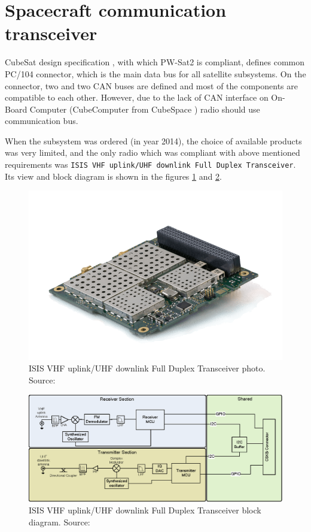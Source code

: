 \section{Spacecraft communication transceiver}
\label{section:comm_design}
CubeSat design specification \cite{cubesat_spec}, with which PW-Sat2 is compliant, defines common PC/104 connector, which is the main data bus for all satellite subsystems. On the connector, two \iic and two CAN buses are defined and most of the components are compatible to each other. However, due to the lack of CAN interface on On-Board Computer (CubeComputer from CubeSpace \cite{cubespace_website}) radio should use \iic communication bus.

When the subsystem was ordered (in year \si{2014}), the choice of available products was very limited, and the only radio which was compliant with above mentioned requirements was \texttt{ISIS VHF uplink/UHF downlink Full Duplex Transceiver}. Its view and block diagram is shown in the figures \ref{ISIS_TRXvU_photo} and \ref{ISIS_TRXvU_block_diagram}.

\begin{figure}[H]
    \centering
    \includegraphics[width=0.5\paperwidth]{img/4/ISIS-radio-UHF-VHF-min.png}
    \caption{ISIS VHF uplink/UHF downlink Full Duplex Transceiver photo. Source: \cite{isis_trxvu}}
    \label{ISIS_TRXvU_photo}
\end{figure}

\begin{figure}[H]
    \centering
    \includegraphics[width=0.8\paperwidth]{img/4/ISIS_TRXvU_block_diagram.eps}
    \caption{ISIS VHF uplink/UHF downlink Full Duplex Transceiver block diagram. Source: \cite{isis_trxvu}}
    \label{ISIS_TRXvU_block_diagram}
\end{figure}

